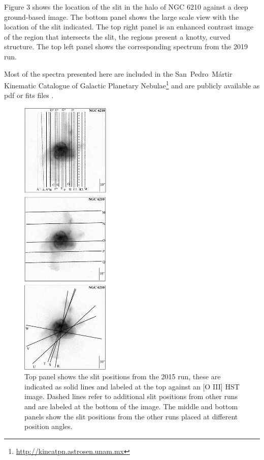 \documentclass[useAMS, usenatbib]{mnras}
\begin{document}
Figure 3 shows the location of the slit in the halo of NGC 6210  against a deep ground-based image. The bottom panel shows the large scale view with the location of the slit indicated. The top right panel is an enhanced contrast image of the region that intersects the slit, the regions present a knotty, curved structure. The top left panel shows the corresponding spectrum from the 2019 run.


Most of the spectra presented here are included in the \mbox{San Pedro Mártir} Kinematic Catalogue of Galactic Planetary Nebulae\footnote{
  \url{http://kincatpn.astrosen.unam.mx}
}
and are publicly available as pdf or fits files
\citep{Lopez:2012a}.

 \begin{figure}
   \centering
   \includegraphics[width=0.38\textwidth]{tere-figs/Figure2a}
  \caption{Top panel shows the slit positions from the 2015 run, these are indicated as solid lines and 
labeled at the top against an [O III] HST image. Dashed lines refer to additional slit positions from other runs
and are labeled at the bottom of the image. The middle and bottom panels show the slit positions from 
the other runs placed at different position angles. }
  \label{fig:slit-positions}
\end{figure}
\end{document}
